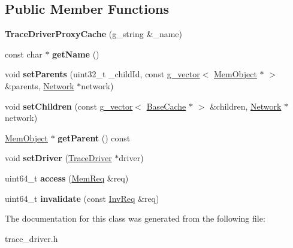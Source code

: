 \subsection*{Public Member Functions}
\begin{DoxyCompactItemize}
\item 
\hypertarget{classTraceDriverProxyCache_ad5ca59ffb64ba31ac887b8661866187c}{{\bfseries Trace\-Driver\-Proxy\-Cache} (g\-\_\-string \&\-\_\-name)}\label{classTraceDriverProxyCache_ad5ca59ffb64ba31ac887b8661866187c}

\item 
\hypertarget{classTraceDriverProxyCache_aa0f558fb9b39b117f6eb3d66c1998625}{const char $\ast$ {\bfseries get\-Name} ()}\label{classTraceDriverProxyCache_aa0f558fb9b39b117f6eb3d66c1998625}

\item 
\hypertarget{classTraceDriverProxyCache_a0259f6810fd340ea625bd89036cce845}{void {\bfseries set\-Parents} (uint32\-\_\-t \-\_\-child\-Id, const \hyperlink{classg__vector}{g\-\_\-vector}$<$ \hyperlink{classMemObject}{Mem\-Object} $\ast$ $>$ \&parents, \hyperlink{classNetwork}{Network} $\ast$network)}\label{classTraceDriverProxyCache_a0259f6810fd340ea625bd89036cce845}

\item 
\hypertarget{classTraceDriverProxyCache_a18eaadba894624e11bbd25412a2a4f43}{void {\bfseries set\-Children} (const \hyperlink{classg__vector}{g\-\_\-vector}$<$ \hyperlink{classBaseCache}{Base\-Cache} $\ast$ $>$ \&children, \hyperlink{classNetwork}{Network} $\ast$network)}\label{classTraceDriverProxyCache_a18eaadba894624e11bbd25412a2a4f43}

\item 
\hypertarget{classTraceDriverProxyCache_a7056ebc7197051c1283417e830cd36b4}{\hyperlink{classMemObject}{Mem\-Object} $\ast$ {\bfseries get\-Parent} () const }\label{classTraceDriverProxyCache_a7056ebc7197051c1283417e830cd36b4}

\item 
\hypertarget{classTraceDriverProxyCache_a1cbce92d89270aac1d26efafaac8b0f5}{void {\bfseries set\-Driver} (\hyperlink{classTraceDriver}{Trace\-Driver} $\ast$driver)}\label{classTraceDriverProxyCache_a1cbce92d89270aac1d26efafaac8b0f5}

\item 
\hypertarget{classTraceDriverProxyCache_af33428c4393b91b0c043440da629934a}{uint64\-\_\-t {\bfseries access} (\hyperlink{structMemReq}{Mem\-Req} \&req)}\label{classTraceDriverProxyCache_af33428c4393b91b0c043440da629934a}

\item 
\hypertarget{classTraceDriverProxyCache_a0ec47f8660cc6fff1825476964377cf0}{uint64\-\_\-t {\bfseries invalidate} (const \hyperlink{structInvReq}{Inv\-Req} \&req)}\label{classTraceDriverProxyCache_a0ec47f8660cc6fff1825476964377cf0}

\end{DoxyCompactItemize}


The documentation for this class was generated from the following file\-:\begin{DoxyCompactItemize}
\item 
trace\-\_\-driver.\-h\end{DoxyCompactItemize}
